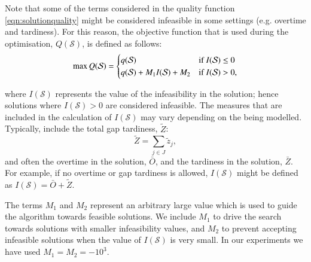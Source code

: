 \documentclass[a4paper,11pt,authoryear]{elsarticle}
\begin{document}
\noindent Note that some of the terms considered in the quality function \eqref{eqn:solutionquality} might be considered infeasible in some settings (e.g. overtime and tardiness). For this reason, the objective function that is used during the optimisation, $Q(\mathcal{S})$, is defined as follows:
\begin{equation}
  \max Q(\mathcal{S}) =
  \begin{cases}
   q(\ensuremath{\mathcal{S}}) & \text{if \ensuremath{I(\mathcal{S}) \leq 0}} \\
   q(\ensuremath{\mathcal{S}}) + \ensuremath{M_1 I(\mathcal{S})} + \ensuremath{M_2} & \text{if \ensuremath{I(\mathcal{S}) > 0}}, \\ \label{eqn:realobjfunction}
  \end{cases}
\end{equation}

\noindent where $I(\mathcal{S})$ represents the value of the infeasibility in the solution; hence solutions where $I(\mathcal{S}) > 0$ are considered infeasible. The measures that are included in the calculation of $I(\mathcal{S})$ may vary depending on the  being modelled. Typically,  include the total gap tardiness, $\tilde{Z}$:
\begin{equation}
    \tilde{Z} = \sum_{j \in J} \tilde{z}_j,
\end{equation}
 and often the overtime in the solution, $\bar{O}$, and the tardiness in the solution, $\bar{Z}$. For example, if no overtime or gap tardiness is allowed, $I(\mathcal{S})$ might be defined as $I(\mathcal{S}) = \bar{O} + \tilde{Z}$.

The terms $M_1$ and $M_2$ represent an arbitrary large value which is used to guide the algorithm towards feasible solutions. We include $M_1$ to drive the search towards solutions with smaller infeasibility values, and $M_2$ to prevent accepting infeasible solutions when the value of $I(\mathcal{S})$ is very small. In our experiments we have used $M_1 = M_2 = -10^3$.

\end{document}
